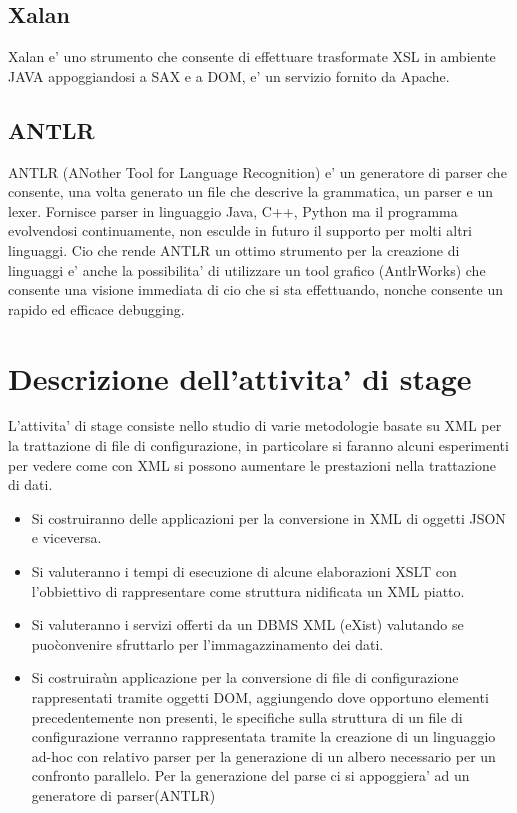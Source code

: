 \documentclass[11pt,titlepage,a4paper,twoside,openany]{book}
\begin{document}
\section{Xalan}
Xalan e' uno strumento che consente di effettuare trasformate XSL in ambiente JAVA appoggiandosi a SAX e a DOM, e' un servizio fornito da Apache.

\section{ANTLR}
ANTLR (ANother Tool for Language Recognition) e' un generatore di parser che consente, una volta generato un file che descrive la grammatica, un parser e un lexer. Fornisce parser in linguaggio Java, C++, Python ma il programma evolvendosi continuamente, non esculde in futuro il supporto per molti altri linguaggi.
Cio che rende ANTLR un ottimo strumento per la creazione di linguaggi e' anche la possibilita' di utilizzare un tool grafico (AntlrWorks) che consente una visione immediata di cio che si sta effettuando, nonche consente un rapido ed efficace debugging.

\chapter{Descrizione dell'attivita' di stage}
L'attivita' di stage consiste nello studio di varie metodologie basate su XML per la trattazione di file di configurazione, in particolare si faranno alcuni esperimenti per vedere come con XML si possono aumentare le prestazioni nella trattazione di dati.
\begin{itemize}
	\item Si costruiranno delle applicazioni per la conversione in XML di oggetti JSON e viceversa.
	\item Si valuteranno i tempi di esecuzione di alcune elaborazioni XSLT con l'obbiettivo di rappresentare come struttura nidificata un XML piatto.
	\item Si valuteranno i servizi offerti da un DBMS XML (eXist) valutando se puo\` convenire sfruttarlo per l'immagazzinamento dei dati.
	\item Si costruira\` un applicazione per la conversione di file di configurazione rappresentati tramite oggetti DOM, aggiungendo dove opportuno elementi precedentemente non presenti, le specifiche sulla struttura di un file di configurazione verranno rappresentata tramite la creazione di un linguaggio ad-hoc con relativo parser per la generazione di un albero necessario per un confronto parallelo. Per la generazione del parse ci si appoggiera' ad un generatore di parser(ANTLR)
\end{itemize}
\end{document}
